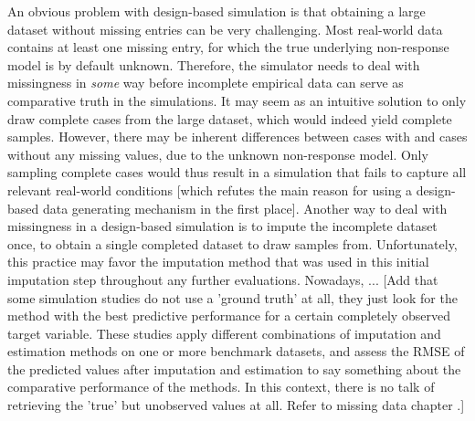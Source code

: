 \documentclass[bimj,fleqn]{w-art}
\theoremstyle{plain}
\theoremstyle{definition}
\begin{document}
An obvious problem with design-based simulation is that obtaining a large dataset without missing entries can be very challenging. Most real-world data contains at least one missing entry, for which the true underlying non-response model is by default unknown. Therefore, the simulator needs to deal with missingness in \textit{some} way before incomplete empirical data can serve as comparative truth in the simulations. It may seem as an intuitive solution to only draw complete cases from the large dataset, which would indeed yield complete samples. However, there may be inherent differences between cases with and cases without any missing values, due to the unknown non-response model. Only sampling complete cases would thus result in a simulation that fails to capture all relevant real-world conditions [which refutes the main reason for using a design-based data generating mechanism in the first place]. Another way to deal with missingness in a design-based simulation is to impute the incomplete dataset once, to obtain a single completed dataset to draw samples from. Unfortunately, this practice may favor the imputation method that was used in this initial imputation step throughout any further evaluations. Nowadays, ... [Add that some simulation studies do not use a 'ground truth' at all, they just look for the method with the best predictive performance for a certain completely observed target variable. These studies apply different combinations of imputation and estimation methods on one or more benchmark datasets, and assess the RMSE of the predicted values after imputation and estimation to say something about the comparative performance of the methods. In this context, there is no talk of retrieving the 'true' but unobserved values at all. Refer to missing data chapter \citep{liu21}.]
\end{document}
